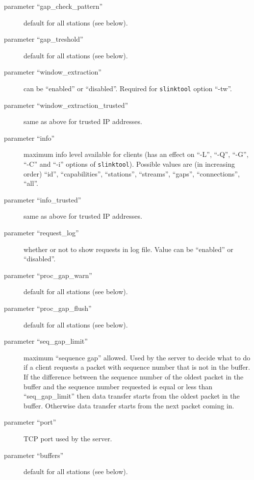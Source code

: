 \documentclass[11pt,a4paper,titlepage]{article}
\begin{document}
\begin{description}
\item[parameter ``gap\_check\_pattern''] default for all stations (see
below).

\item[parameter ``gap\_treshold'' ] default for all stations
(see below).

\item[parameter ``window\_extraction'' ] can be ``enabled''
or ``disabled''. Required for \verb+slinktool+ option ``-tw''.

\item[parameter ``window\_extraction\_trusted'' ] same as
above for trusted IP addresses.

\item[parameter ``info'' ] maximum info level available
for clients (has an effect on ``-L'', ``-Q'', ``-G'', ``-C'' and ``-i''
options of \verb+slinktool+).  Possible values are (in increasing order)
``id'', ``capabilities'', ``stations'', ``streams'', ``gaps'',
``connections'', ``all''.

\item[parameter ``info\_trusted'' ] same as above for
trusted IP addresses.

\item[parameter ``request\_log'' ] whether or not to show
requests in log file. Value can be ``enabled'' or ``disabled''.

\item[parameter ``proc\_gap\_warn'' ] default for all stations (see
below).

\item[parameter ``proc\_gap\_flush'' ] default for all stations (see
below).

\item[parameter ``seq\_gap\_limit'' ] maximum ``sequence gap''
allowed. Used by the server to decide what to do if a client requests a
packet with sequence number that is not in the buffer. If the difference
between the sequence number of the oldest packet in the buffer and the
sequence number requested is equal or less than ``seq\_gap\_limit'' then
data transfer starts from the oldest packet in the buffer. Otherwise data
transfer starts from the next packet coming in.

\item[parameter ``port'' ] TCP port used by the server.

\item[parameter ``buffers'' ] default for all stations (see
below).


\end{description}
\end{document}
